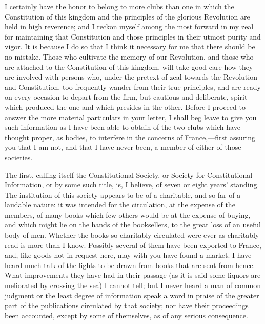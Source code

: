 I certainly have the honor to belong to more clubs than one in which the Constitution of this kingdom and the principles of the glorious Revolution are held in high reverence; and I reckon myself among the most forward in my zeal for maintaining that Constitution and those principles in their utmost purity and vigor. It is because I do so that I think it necessary for me that there should be no mistake. Those who cultivate the memory of our Revolution, and those who are attached to the Constitution of this kingdom, will take good care how they are involved with persons who, under the pretext of zeal towards the Revolution and Constitution, too frequently wander from their true principles, and are ready on every occasion to depart from the firm, but cautious and deliberate, spirit which produced the one and which presides in the other. Before I proceed to answer the more material particulars in your letter, I shall beg leave to give you such information as I have been able to obtain of the two clubs which have thought proper, as bodies, to interfere in the concerns of France,—first assuring you that I am not, and that I have never been, a member of either of those societies.

The first, calling itself the Constitutional Society, or Society for Constitutional Information, or by some such title, is, I believe, of seven or eight years' standing. The institution of this society appears to be of a charitable, and so far of a laudable nature: it was intended for the circulation, at the expense of the members, of many books which few others would be at the expense of buying, and which might lie on the hands of the booksellers, to the great loss of an useful body of men. Whether the books so charitably circulated were ever as charitably read is more than I know. Possibly several of them have been exported to France, and, like goods not in request here, may with you have found a market. I have heard much talk of the lights to be drawn from books that are sent from hence. What improvements they have had in their passage (as it is said some liquors are meliorated by crossing the sea) I cannot tell; but I never heard a man of common judgment or the least degree of information speak a word in praise of the greater part of the publications circulated by that society; nor have their proceedings been accounted, except by some of themselves, as of any serious consequence.

